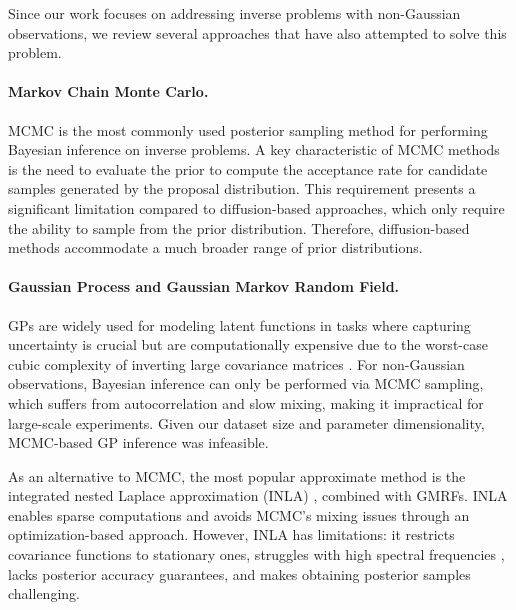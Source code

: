 Since our work focuses on addressing inverse problems with non-Gaussian observations, we review several approaches that have also attempted to solve this problem.

\paragraph{Markov Chain Monte Carlo.} MCMC is the most commonly used posterior sampling method for performing Bayesian inference on inverse problems.  A key characteristic of MCMC methods is the need to evaluate the prior to compute the acceptance rate for candidate samples generated by the proposal distribution. This requirement presents a significant limitation compared to diffusion-based approaches, which only require the ability to sample from the prior distribution. Therefore, diffusion-based methods accommodate a much broader range of prior distributions.


\paragraph{Gaussian Process and Gaussian Markov Random Field.} GPs are widely used for modeling latent functions in tasks where capturing uncertainty is crucial but are computationally expensive due to the worst-case cubic complexity of inverting large covariance matrices \citep{Rasmussen_GP, Adams2009}. For non-Gaussian observations, Bayesian inference can only be performed via MCMC sampling, which suffers from autocorrelation and slow mixing, making it impractical for large-scale experiments. Given our dataset size and parameter dimensionality, MCMC-based GP inference was infeasible.

As an alternative to MCMC, the most popular approximate method is the integrated nested Laplace approximation (INLA) \cite{Rue2005}, combined with GMRFs. INLA enables sparse computations and avoids MCMC’s mixing issues through an optimization-based approach. However, INLA has limitations: it restricts covariance functions to stationary ones, struggles with high spectral frequencies \cite{Stein2014-hc}, lacks posterior accuracy guarantees, and makes obtaining posterior samples challenging.






